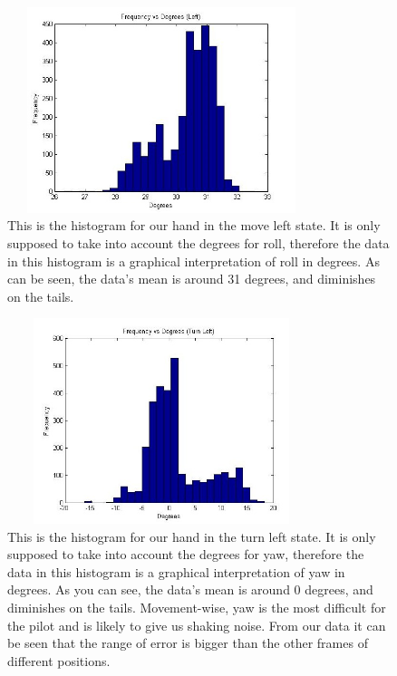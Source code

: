 \documentclass[letterpaper,english, 12pt]{article}
\begin{document}
\begin{figure}[H]
	\centering
	\includegraphics[height=6cm,width=90mm]{pics/leftHistogram1.jpg}
	\caption{This is the histogram for our hand in the move left state. It is only supposed to take into account the degrees for roll, therefore the data in this histogram is a graphical interpretation of roll in degrees.  As can be seen, the data's mean is around 31 degrees, and diminishes on the tails.}
\end{figure}

\begin{figure}[H]
	\centering
	\includegraphics[height=6cm,width=90mm]{pics/turnLeftHistogram1.jpg}
	\caption{This is the histogram for our hand in the turn left state. It is only supposed to take into account the degrees for yaw, therefore the data in this histogram is a graphical interpretation of yaw in degrees.  As you can see, the data's mean is around 0 degrees, and diminishes on the tails. Movement-wise, yaw is the most difficult for the pilot and is likely to give us shaking noise.  From our data it can be seen that the range of error is bigger than the other frames of different positions.}
\end{figure}
\end{document}
